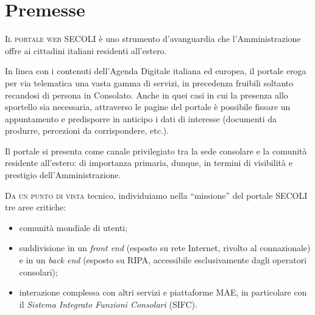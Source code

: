 \documentclass[headinclude,footinclude,a4paper,11pt,final]{scrreprt}
\begin{document}
\endgroup
\vfill
\thispagestyle{empty}
\setcounter{page}{1}



\chapter{Premesse}

\lettrine{I}{l portale web SECOLI} è uno strumento d'avanguardia che l'Amministrazione offre ai cittadini italiani residenti all'estero.

In linea con i contenuti dell'Agenda Digitale italiana ed europea, il portale eroga per via telematica una vasta gamma di servizi, in precedenza fruibili soltanto recandosi di persona in Consolato.  Anche in quei casi in cui la presenza allo sportello sia necessaria, attraverso le pagine del portale è possibile fissare un appuntamento e predisporre in anticipo i dati di interesse (documenti da produrre, percezioni da corrispondere, etc.).

Il portale si presenta come canale privilegiato tra la sede consolare e la comunità residente all'estero:  di importanza primaria, dunque, in termini di visibilità e prestigio dell'Amministrazione.

\bigskip

\lettrine{D}{a un punto di vista} tecnico, individuiamo nella ``missione'' del portale SECOLI tre aree critiche:
\begin{itemize}
\item comunità mondiale di utenti;
\item suddivisione in un \emph{front end} (esposto su rete Internet, rivolto al connazionale) e in un \emph{back end} (esposto su RIPA, accessibile esclusivamente dagli operatori consolari);
\item interazione complessa con altri servizi e piattaforme MAE, in particolare con il \emph{Sistema Integrato Funzioni Consolari} (SIFC).
\end{itemize}
\end{document}
